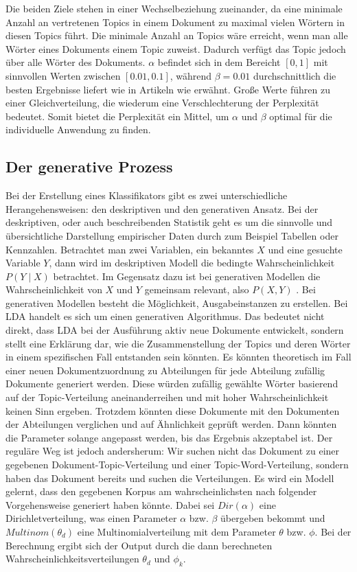 \documentclass[german,version-2020-11]{uzl-thesis}
\begin{document}
Die beiden Ziele stehen in einer Wechselbeziehung zueinander, da eine minimale Anzahl an vertretenen Topics in einem Dokument zu maximal vielen Wörtern in diesen Topics führt. Die minimale Anzahl an Topics wäre erreicht, wenn man alle Wörter eines Dokuments einem Topic zuweist. Dadurch verfügt das Topic jedoch über alle Wörter des Dokuments. $\alpha$ befindet sich in dem Bereicht $[0,1]$ mit sinnvollen Werten zwischen $[0.01, 0.1]$, während $\beta =0.01$ durchschnittlich die besten Ergebnisse liefert wie in Artikeln wie \cite{magnus} erwähnt. Große Werte führen zu einer Gleichverteilung, die wiederum eine Verschlechterung der Perplexität bedeutet. Somit bietet die Perplexität ein Mittel, um $\alpha$ und $\beta$ optimal für die individuelle Anwendung zu finden. \\



\subsection{Der generative Prozess} 
Bei der Erstellung eines Klassifikators gibt es zwei unterschiedliche Herangehensweisen: den deskriptiven und den generativen Ansatz. Bei der deskriptiven, oder auch beschreibenden Statistik geht es um die sinnvolle und übersichtliche Darstellung empirischer Daten durch zum Beispiel Tabellen oder Kennzahlen. Betrachtet man zwei Variablen, ein bekanntes $X$ und eine gesuchte Variable $Y$, dann wird im deskriptiven Modell die bedingte Wahrscheinlichkeit $P(Y \mid X)$ betrachtet. Im Gegensatz dazu ist bei generativen Modellen die Wahrscheinlichkeit von $X$ und $Y$ gemeinsam relevant, also $P(X, Y)$ . Bei generativen Modellen besteht die Möglichkeit, Ausgabeinstanzen zu erstellen. Bei LDA handelt es sich um einen generativen Algorithmus. Das bedeutet nicht direkt, dass LDA bei der Ausführung aktiv neue Dokumente entwickelt, sondern stellt eine Erklärung dar, wie die Zusammenstellung der Topics und deren Wörter in einem spezifischen Fall entstanden sein könnten. Es könnten theoretisch im Fall einer neuen Dokumentzuordnung zu Abteilungen für jede Abteilung zufällig Dokumente generiert werden. Diese würden zufällig gewählte Wörter basierend auf der Topic-Verteilung aneinanderreihen und mit hoher Wahrscheinlichkeit keinen Sinn ergeben. Trotzdem könnten diese Dokumente mit den Dokumenten der Abteilungen verglichen und auf Ähnlichkeit geprüft werden. Dann könnten die Parameter solange angepasst werden, bis das Ergebnis akzeptabel ist. Der reguläre Weg ist jedoch andersherum: Wir suchen nicht das Dokument zu einer gegebenen Dokument-Topic-Verteilung und einer Topic-Word-Verteilung, sondern haben das Dokument bereits und suchen die Verteilungen. Es wird ein Modell gelernt, dass den gegebenen Korpus am wahrscheinlichsten nach folgender Vorgehensweise generiert haben könnte. Dabei sei $Dir(\alpha)$ eine Dirichletverteilung, was einen Parameter $\alpha$ bzw. $\beta$ übergeben bekommt und $Multinom(\theta_d)$ eine Multinomialverteilung mit dem Parameter $\theta$ bzw. $\phi$. Bei der Berechnung ergibt sich der Output durch die dann berechneten Wahrscheinlichkeitsverteilungen $\theta_d$ und $\phi_k$.
\end{document}
